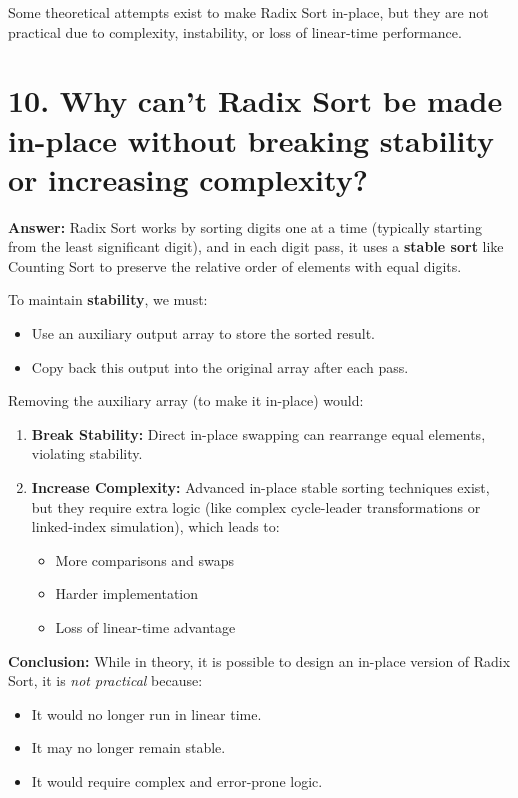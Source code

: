 \documentclass[14pt]{extarticle}
\begin{document}
Some theoretical attempts exist to make Radix Sort in-place, but they are not practical due to complexity, instability, or loss of linear-time performance.

\section*{10. Why can't Radix Sort be made in-place without breaking stability or increasing complexity?}

\textbf{Answer:} Radix Sort works by sorting digits one at a time (typically starting from the least significant digit), and in each digit pass, it uses a \textbf{stable sort} like Counting Sort to preserve the relative order of elements with equal digits.

To maintain \textbf{stability}, we must:
\begin{itemize}[leftmargin=1.5em]
    \item Use an auxiliary output array to store the sorted result.
    \item Copy back this output into the original array after each pass.
\end{itemize}

Removing the auxiliary array (to make it in-place) would:
\begin{enumerate}[leftmargin=1.5em]
    \item \textbf{Break Stability:} Direct in-place swapping can rearrange equal elements, violating stability.
    \item \textbf{Increase Complexity:} Advanced in-place stable sorting techniques exist, but they require extra logic (like complex cycle-leader transformations or linked-index simulation), which leads to:
    \begin{itemize}
        \item More comparisons and swaps
        \item Harder implementation
        \item Loss of linear-time advantage
    \end{itemize}
\end{enumerate}

\textbf{Conclusion:} While in theory, it is possible to design an in-place version of Radix Sort, it is \textit{not practical} because:
\begin{itemize}
    \item It would no longer run in linear time.
    \item It may no longer remain stable.
    \item It would require complex and error-prone logic.
\end{itemize}
\end{document}
